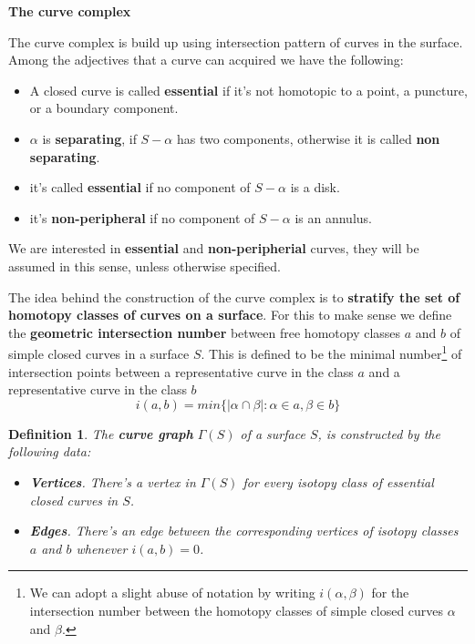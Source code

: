 \documentclass[a4paper]{tufte-handout}
\newtheorem{defini}{Definition}[theorem]
\begin{document}
\noindent \hrulefill

{\Large \noindent \textbf{The curve complex}}

The curve complex is build up using intersection pattern of curves in the surface. Among the adjectives that a curve can acquired we have the following:
\begin{itemize}
    \item A closed curve is called \textbf{essential} if it's not homotopic to a point, a puncture, or a boundary component.
    \item $\alpha$ is \textbf{separating}, if $S-\alpha$ has two components, otherwise it is called \textbf{non separating}.
    \item it's called \textbf{essential} if no component of $S- \alpha$ is a disk.
    \item it's \textbf{non-peripheral} if no component of $S - \alpha$ is an annulus. 
\end{itemize}

We are interested in \textbf{essential} and \textbf{non-peripherial} curves, they will be assumed in this sense, unless otherwise specified.

The idea behind the construction of the curve complex is to \textbf{stratify the set of homotopy classes of curves on a surface}. For this to make sense we define the \textbf{geometric intersection number} between free homotopy classes $a$ and $b$ of simple closed curves in a surface $S$. This is defined to be the minimal number\footnote{We can adopt a slight abuse of notation by writing $i(\alpha, \beta)$ for the intersection number between the homotopy classes of simple closed curves $\alpha$ and $\beta$.} of intersection points between a representative curve in the class $a$ and a representative curve in the class $b$
$$i(a,b) = min \{ |\alpha \cap \beta| : \alpha \in a, \beta \in b \}$$ 

\begin{defini}
The \textbf{curve graph} $\Gamma(S)$ of a surface $S$, is constructed by the following data:
\begin{itemize}
\item \textbf{Vertices}. There's a vertex in $\Gamma(S)$ for every isotopy class of essential closed curves in $S$.
\item \textbf{Edges}. There's an edge between the corresponding vertices of isotopy classes $a$ and $b$ whenever $i(a,b)=0$.
\end{itemize}
\end{defini}
\end{document}
